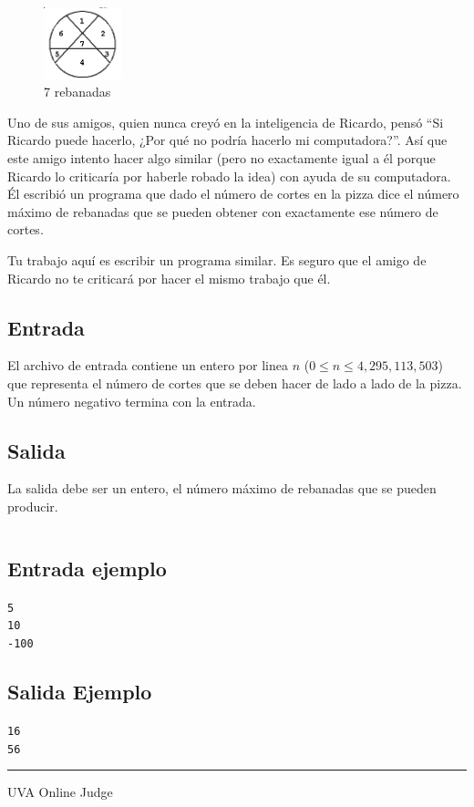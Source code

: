 \documentclass[letter,10pt]{article}
\newcommand{\lyxaddress}[1]{
\par {\raggedright #1
\vspace{1.4em}
\noindent\par}
}
\begin{document}
\begin{figure}[h!]
	\centering
	\includegraphics[width=0.20\textwidth]{pizza}
  	\caption{7 rebanadas}
\end{figure}

Uno de sus amigos, quien nunca creyó en la inteligencia de Ricardo, pensó ``Si Ricardo puede hacerlo, ¿Por qué no podría hacerlo mi computadora?''. Así que este amigo intento hacer algo similar (pero no exactamente igual a él porque Ricardo lo criticaría por haberle robado la idea) con ayuda de su computadora. Él escribió un programa que dado el número de cortes en la pizza dice el número máximo de rebanadas que se pueden obtener con exactamente ese número de cortes.

Tu trabajo aquí es escribir un programa similar. Es seguro que el amigo de Ricardo no te criticará por hacer el mismo trabajo que él.

\subsection*{Entrada}

El archivo de entrada contiene un entero por linea $n$ ($0 \leq n \leq 4,295,113,503$) que representa el número de cortes que se deben hacer de lado a lado de la pizza. Un número negativo termina con la entrada.

\subsection*{Salida}

La salida debe ser un entero, el número máximo de rebanadas que se pueden producir.

$$$$
$$$$
$$$$
$$$$
$$$$

\subsection*{Entrada ejemplo}
\noindent \texttt{5}~\\
\texttt{10}~\\
\texttt{-100}~\\
\noindent 

\subsection*{Salida Ejemplo}

\noindent \texttt{16}~\\
\texttt{56}~\\

\noindent \rule[0.5ex]{1\columnwidth}{1pt}


\lyxaddress{UVA Online Judge}
\end{document}
